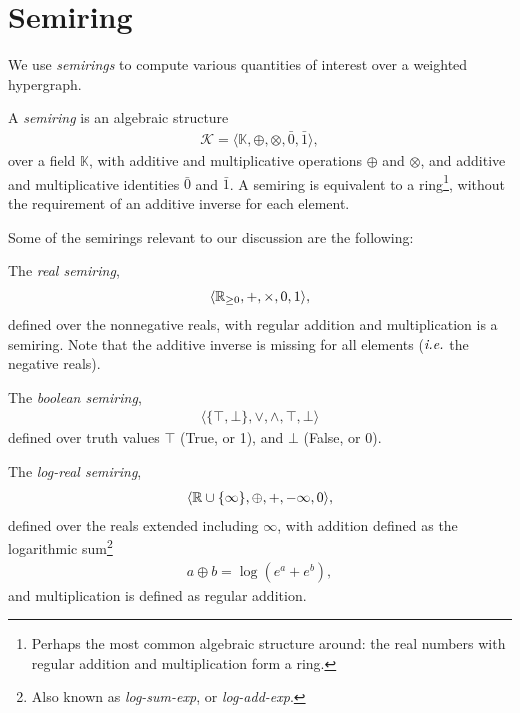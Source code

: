 \section{Semiring}
  We use \textit{semirings} to compute various quantities of interest over a weighted hypergraph.

  \begin{definition}{}
    A \textit{semiring} is an algebraic structure
    \begin{align*}
      \mathcal{K} = \langle \mathbb{K}, \oplus, \otimes, \bar{0}, \bar{1} \rangle,
    \end{align*}
    over a field $\mathbb{K}$, with additive and multiplicative operations $\oplus$ and $\otimes$, and additive and multiplicative identities $\bar{0}$ and $\bar{1}$. A semiring is equivalent to a ring\footnote{Perhaps the most common algebraic structure around: the real numbers with regular addition and multiplication form a ring.}, without the requirement of an additive inverse for each element.
  \end{definition}

  Some of the semirings relevant to our discussion are the following:
  \begin{example}{}
    The \textit{real semiring},
    \begin{align*}
      \langle \mathbb{R}_{\geq 0}, +, \times, 0, 1 \rangle,
    \end{align*}
    defined over the nonnegative reals, with regular addition and multiplication is a semiring. Note that the additive inverse is missing for all elements ($\emph{i.e.}$ the negative reals).
  \end{example}

  \begin{example}{}
    The \textit{boolean semiring},
    \begin{align*}
      \langle \{ \top, \bot \}, \vee, \wedge, \top, \bot  \rangle
    \end{align*}
    defined over truth values $\top$ (True, or 1), and $\bot$ (False, or 0).
  \end{example}

  \begin{example}{}
    The \textit{log-real semiring},
    \begin{align*}
      \langle \mathbb{R} \cup \{ \infty \}, \oplus, +, -\infty, 0 \rangle,
    \end{align*}
    defined over the reals extended including $\infty$, with addition defined as the logarithmic sum\footnote{Also known as \textit{log-sum-exp}, or \textit{log-add-exp}.}
    \begin{align*}
      a \oplus b = \log( e^{a} + e^{b} ),
    \end{align*}
   and multiplication is defined as regular addition.
  \end{example}

